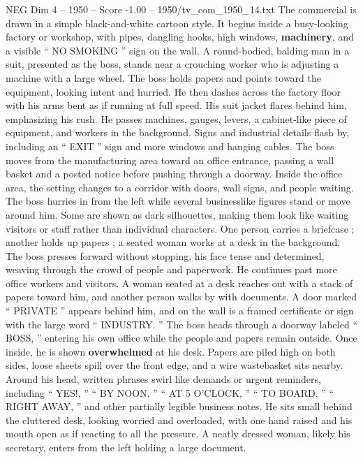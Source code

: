 \begin{textsample}{NEG Dim 4 – 1950 – Score -1.00 – 1950/tv\_com\_1950\_14.txt}  \label{ex:f4_neg_066}
The commercial is drawn in a simple black-and-white cartoon style.
It begins inside a busy-looking factory or workshop, with pipes, dangling hooks, high windows, \textbf{machinery}, and a visible “ NO SMOKING ” sign on the wall.
A round-bodied, balding man in a suit, presented as the boss, stands near a crouching worker who is adjusting a machine with a large wheel.
The boss holds papers and points toward the equipment, looking intent and hurried.
He then dashes across the factory floor with his arms bent as if running at full speed.
His suit jacket flares behind him, emphasizing his rush.
He passes machines, gauges, levers, a cabinet-like piece of equipment, and workers in the background.
Signs and industrial details flash by, including an “ EXIT ” sign and more windows and hanging cables.
The boss moves from the manufacturing area toward an office entrance, passing a wall basket and a posted notice before pushing through a doorway.
Inside the office area, the setting changes to a corridor with doors, wall signs, and people waiting.
The boss hurries in from the left while several businesslike figures stand or move around him.
Some are shown as dark silhouettes, making them look like waiting visitors or staff rather than individual characters.
One person carries a briefcase ; another holds up papers ; a seated woman works at a desk in the background.
The boss presses forward without stopping, his face tense and determined, weaving through the crowd of people and paperwork.
He continues past more office workers and visitors.
A woman seated at a desk reaches out with a stack of papers toward him, and another person walks by with documents.
A door marked “ PRIVATE ” appears behind him, and on the wall is a framed certificate or sign with the large word “ INDUSTRY. ” The boss heads through a doorway labeled “ BOSS, ” entering his own office while the people and papers remain outside.
Once inside, he is shown \textbf{overwhelmed} at his desk.
Papers are piled high on both sides, loose sheets spill over the front edge, and a wire wastebasket sits nearby.
Around his head, written phrases swirl like demands or urgent reminders, including “ YES!, ” “ BY NOON, ” “ AT 5 O’CLOCK, ” “ TO BOARD, ” “ RIGHT AWAY, ” and other partially legible business notes.
He sits small behind the cluttered desk, looking worried and overloaded, with one hand raised and his mouth open as if reacting to all the pressure.
A neatly dressed woman, likely his secretary, enters from the left holding a large document.

\end{textsample}
